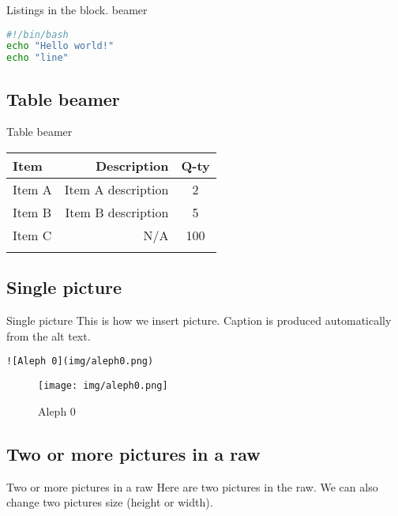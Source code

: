 \documentclass[
  ignorenonframetext,
  aspectratio=169,
  aspectratio=169]{beamer}
\begin{document}
\begin{frame}[fragile]{Listings in the block. beamer}
\label{listings-in-the-block.-beamer}
\begin{lstlisting}[language=sh]
#!/bin/bash
echo "Hello world!"
echo "line"
\end{lstlisting}
\end{frame}

\subsection{Table beamer}\label{table-beamer}

\begin{frame}{Table beamer}
\begin{longtable}[]{@{}lrc@{}}
\toprule\noalign{}
\textbf{Item} & \textbf{Description} & \textbf{Q-ty} \\
\midrule\noalign{}
\endhead
Item A & Item A description & 2 \\
Item B & Item B description & 5 \\
Item C & N/A & 100 \\
\bottomrule\noalign{}
\end{longtable}
\end{frame}

\subsection{Single picture}\label{single-picture}

\begin{frame}[fragile]{Single picture}
This is how we insert picture. Caption is produced automatically from
the alt text.

\begin{lstlisting}
![Aleph 0](img/aleph0.png) 
\end{lstlisting}

\begin{figure}
\centering
\texttt{[image: img/aleph0.png]}
\caption{Aleph 0}
\end{figure}
\end{frame}

\subsection{Two or more pictures in a
raw}\label{two-or-more-pictures-in-a-raw}

\begin{frame}{Two or more pictures in a raw}
Here are two pictures in the raw. We can also change two pictures size
(height or width).
\end{frame}
\end{document}
